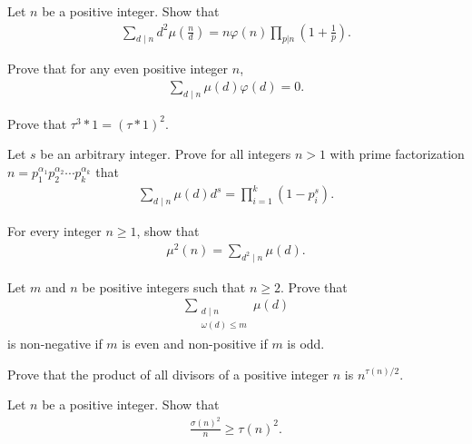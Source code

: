 \documentclass[12pt]{subfile}
\begin{document}
	\begin{problem}
		Let $n$ be a positive integer. Show that
			\begin{align*}
				\sum_{d\mid n} d^2 \mu\left(\frac{n}{d}\right) = n \varphi(n) \prod_{p|n} \left(1+ \frac{1}{p}\right).
			\end{align*}
	\end{problem}

	\begin{problem}
		Prove that for any even positive integer $n$,
			\begin{align*}
				\sum_{d\mid n} \mu(d)\varphi(d) = 0.
			\end{align*}
	\end{problem}

	\begin{problem}
		Prove that $\tau^3 \ast 1 = (\tau\ast 1)^2$.
	\end{problem}

	\begin{problem}
		Let $s$ be an arbitrary integer. Prove for all integers $n >1$ with prime factorization $n= p_1^{\alpha_1} p_2^{\alpha_2} \cdots p_k^{\alpha_k}$ that
			\begin{align*}
			\sum_{d\mid n} \mu (d) d^s = \prod_{i=1}^{k} (1-p_i^s).
			\end{align*}
	\end{problem}

	\begin{problem}
		For every integer $n \geq 1$, show that
			\begin{align*}
				\mu^2(n)=\sum_{d^2\mid n}\mu(d).
			\end{align*}
	\end{problem}

	\begin{problem}
		Let $m$ and $n$ be positive integers such that $n \geq 2$. Prove that
			\begin{align*}
				\sum\limits_{\substack{d\mid n \\ \omega(d) \leq m}} \mu(d)
			\end{align*}
		is non-negative if $m$ is even and non-positive if $m$ is odd.
	\end{problem}

	\begin{problem}
		Prove that the product of all divisors of a positive integer $n$ is $n^{\tau(n)/2}$.
	\end{problem}

	\begin{problem}
		Let $n$ be a positive integer. Show that
			\begin{align*}
				\frac{\sigma(n)^2}{n} \geq \tau(n)^2.
			\end{align*}
	\end{problem}
\end{document}
